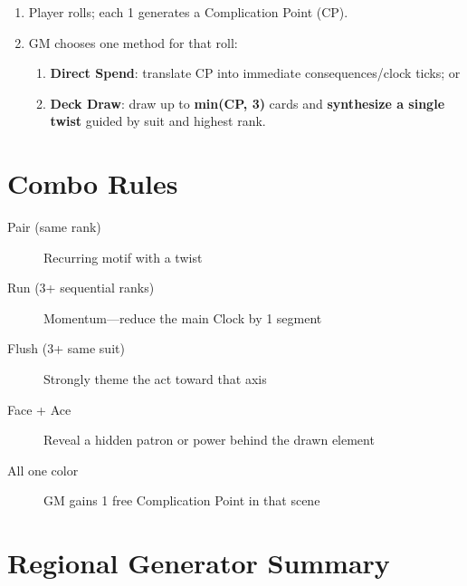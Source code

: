 \begin{enumerate}
  \item Player rolls; each 1 generates a Complication Point (CP).
  \item GM chooses one method for that roll:
  \begin{enumerate}
    \item \textbf{Direct Spend}: translate CP into immediate consequences/clock ticks; or
    \item \textbf{Deck Draw}: draw up to \textbf{min(CP, 3)} cards and \textbf{synthesize a single twist}
    guided by suit and highest rank.
  \end{enumerate}
\end{enumerate}

\section{Combo Rules}

\begin{description}
\item[Pair (same rank)] Recurring motif with a twist
\item[Run (3+ sequential ranks)] Momentum---reduce the main Clock by 1 segment
\item[Flush (3+ same suit)] Strongly theme the act toward that axis
\item[Face + Ace] Reveal a hidden patron or power behind the drawn element
\item[All one color] GM gains 1 free Complication Point in that scene
\end{description}

\section{Regional Generator Summary}

